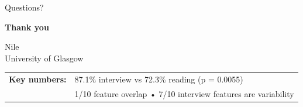 \documentclass[aspectratio=169,11pt]{beamer}
\begin{document}
\begin{frame}{Questions?}
    \vfill
    
    \begin{center}
        {\Huge\color{accentblue}\faComments}
        
        \vspace{0.8cm}
        
        {\Large\bfseries\color{uofgblue} Thank you}
        
        \vspace{0.5cm}
        
        {\large Nile}\\
        {\small University of Glasgow}
    \end{center}
    
    \vfill
    
    \begin{center}
        \footnotesize\color{darkgrey}
        \begin{tabular}{rl}
            \textbf{Key numbers:} & 87.1\% interview vs 72.3\% reading (p = 0.0055) \\
            & 1/10 feature overlap • 7/10 interview features are variability \\
        \end{tabular}
    \end{center}
    
    \vfill
\end{frame}
\end{document}
